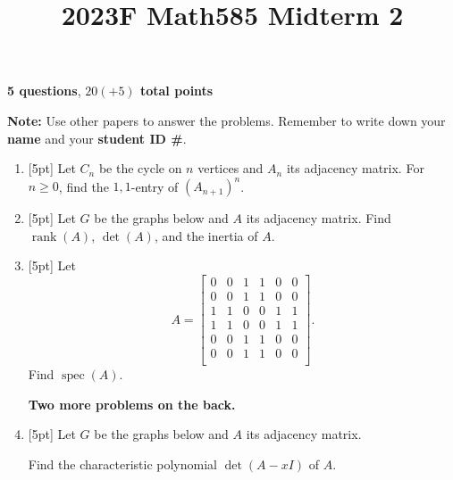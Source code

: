 \documentclass{article}
\title{2023F Math585 Midterm 2}
\date{\vspace{-1cm}}
\newcommand{\rank}{\operatorname{rank}}
\newcommand{\spec}{\operatorname{spec}}
\begin{document}
\maketitle
\large

\textbf{5 questions}, \textbf{$20(+5)$ total points}

\textbf{Note:}  Use other papers to answer the problems.  Remember to write down your \textbf{name} and your \textbf{student ID \#}.

\begin{enumerate}
\setlength\itemsep{2em}

\item{} [5pt] Let $C_n$ be the cycle on $n$ vertices and $A_n$ its adjacency matrix.  For $n\geq 0$, find the $1,1$-entry of $(A_{n+1})^n$.  

\item{} [5pt] Let $G$ be the graphs below and $A$ its adjacency matrix.   Find $\rank(A)$, $\det(A)$, and the inertia of $A$.  
\begin{center}
\end{center}


\item{} [5pt] Let  
\[A = \begin{bmatrix}
    0 & 0 & 1 & 1 & 0 & 0 \\
    0 & 0 & 1 & 1 & 0 & 0 \\
    1 & 1 & 0 & 0 & 1 & 1 \\
    1 & 1 & 0 & 0 & 1 & 1 \\
    0 & 0 & 1 & 1 & 0 & 0 \\
    0 & 0 & 1 & 1 & 0 & 0 \\
\end{bmatrix}.
\]
Find $\spec(A)$.  


\vfill

\textbf{Two more problems on the back.}

\newpage
\item{} [5pt] Let $G$ be the graphs below and $A$ its adjacency matrix.  

\begin{center}
\end{center}
Find the characteristic polynomial $\det(A - xI)$ of $A$.


\end{enumerate}
\end{document}
